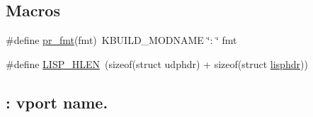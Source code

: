 \subsection*{Macros}
\begin{DoxyCompactItemize}
\item 
\#define \hyperlink{vport-lisp_8c_a1f8c165bf4196327bc3abff648276d92}{pr\+\_\+fmt}(fmt)~K\+B\+U\+I\+L\+D\+\_\+\+M\+O\+D\+N\+A\+M\+E \char`\"{}\+: \char`\"{} fmt
\item 
\#define \hyperlink{vport-lisp_8c_a432175729adc4f68dad362484b077981}{L\+I\+S\+P\+\_\+\+H\+L\+E\+N}~(sizeof(struct udphdr) + sizeof(struct \hyperlink{structlisphdr}{lisphdr}))
\end{DoxyCompactItemize}
\subsection*{\+: vport name.}
\label{_amgrp11b33af0c85e2c8a3c03b696f666e431}%
